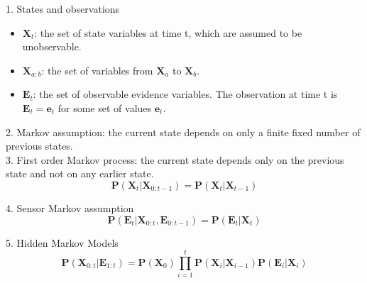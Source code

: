 \documentclass[12pt]{article}
\begin{document}
1. States and observations
\begin{itemize}
\item $\boldsymbol{X}_t$: the set of state variables at time t, which are assumed to be unobservable.
\item $\boldsymbol{X}_{a:b}$: the set of variables from $\boldsymbol{X}_a$ to $\boldsymbol{X}_b$.
\item $\boldsymbol{E}_t$: the set of observable evidence variables. The observation at time t is $\boldsymbol{E}_t = \boldsymbol{e}_t$ for some set of values $\boldsymbol{e}_t$.
\end{itemize}

2. Markov assumption: the current state depends on only a finite fixed number of previous states. \\

3. First order Markov process: the current state depends only on the previous state and not on any earlier state.
\begin{equation*}
\boldsymbol{P}(\boldsymbol{X}_t | \boldsymbol{X}_{0:t-1})
= \boldsymbol{P}(\boldsymbol{X}_t | \boldsymbol{X}_{t-1})
\end{equation*}

4. Sensor Markov assumption
\begin{equation*}
\boldsymbol{P}(\boldsymbol{E}_t | \boldsymbol{X}_{0:t}, \boldsymbol{E}_{0:t-1})
= \boldsymbol{P}(\boldsymbol{E}_t | \boldsymbol{X}_t)
\end{equation*}

5. Hidden Markov Models
\begin{equation*}
\boldsymbol{P}(\boldsymbol{X}_{0:t} | \boldsymbol{E}_{1:t})
= \boldsymbol{P}(\boldsymbol{X}_0)
  \prod^t_{i=1} \boldsymbol{P}(\boldsymbol{X}_i | \boldsymbol{X}_{i-1})
  \boldsymbol{P}(\boldsymbol{E}_i | \boldsymbol{X}_i)
\end{equation*}
\end{document}
